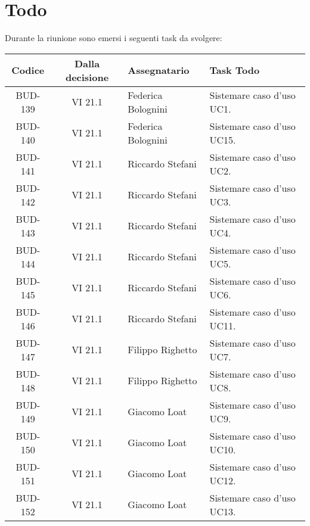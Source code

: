 
\section{Todo}

Durante la riunione sono emersi i seguenti task da svolgere:

\vspace{0.5cm}

\begin{table}[htbp]
\centering
{}
\begin{tabular}{|c|c|p{}|p{}|}
    \hline
    \rowcolor[gray]{0.75}
    \textbf{Codice} & \textbf{Dalla decisione} & \textbf{Assegnatario} & \textbf{Task Todo} \\
    \hline
    BUD-139 & VI 21.1 & Federica Bolognini & Sistemare caso d'uso UC1. \\
    \hline
    BUD-140 & VI 21.1 & Federica Bolognini & Sistemare caso d'uso UC15. \\
    \hline
    BUD-141 & VI 21.1 & Riccardo Stefani & Sistemare caso d'uso UC2. \\
    \hline
    BUD-142 & VI 21.1 & Riccardo Stefani & Sistemare caso d'uso UC3. \\
    \hline
    BUD-143 & VI 21.1 & Riccardo Stefani & Sistemare caso d'uso UC4. \\
    \hline
    BUD-144 & VI 21.1 & Riccardo Stefani & Sistemare caso d'uso UC5. \\
    \hline
    BUD-145 & VI 21.1 & Riccardo Stefani & Sistemare caso d'uso UC6. \\
    \hline
    BUD-146 & VI 21.1 & Riccardo Stefani & Sistemare caso d'uso UC11. \\
    \hline
    BUD-147 & VI 21.1 & Filippo Righetto & Sistemare caso d'uso UC7. \\
    \hline
    BUD-148 & VI 21.1 & Filippo Righetto & Sistemare caso d'uso UC8. \\
    \hline
    BUD-149 & VI 21.1 & Giacomo Loat & Sistemare caso d'uso UC9. \\
    \hline
    BUD-150 & VI 21.1 & Giacomo Loat & Sistemare caso d'uso UC10. \\
    \hline
    BUD-151 & VI 21.1 & Giacomo Loat & Sistemare caso d'uso UC12. \\
    \hline
    BUD-152 & VI 21.1 & Giacomo Loat & Sistemare caso d'uso UC13. \\

\end{tabular}
\end{table}

